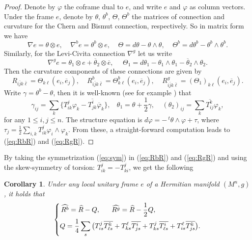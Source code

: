 \documentclass{amsart}
\newtheorem{corollary}[theorem]{Corollary}
\numberwithin{equation}{section}
\begin{document}
\begin{proof}
Denote by $\varphi$ the coframe dual to $e$, and write $e$ and $\varphi$ as column vectors. Under the frame $e$, denote by $\theta$, $\theta^b$, $\Theta$, $\Theta^b$ the matrices of connection and curvature for the Chern and Bismut connection, respectively. So in matrix form we have
$$\nabla e = \theta \otimes  e, \ \ \ \ \ \nabla^b e = \theta^b \otimes  e, \ \ \ \ \ \Theta = d\theta - \theta \wedge \theta,  \ \ \ \ \ \Theta^b = d\theta^b - \theta^b \wedge \theta^b. $$
Similarly, for the Levi-Civita connection $\nabla^g$ let us write
$$ \nabla^g e = \theta_1 \otimes e + \overline{\theta}_2 \otimes \overline{e}, \ \ \ \ \ \  \Theta_1 = d\theta_1 - \theta_1 \wedge \theta_1 - \overline{\theta}_2 \wedge \theta_2. $$
Then the curvature components of these connections are given by
$$ R_{i\bar{j}k\bar{\ell}}= \Theta_{k\ell} (e_i, \overline{e}_j), \ \ \ \ \ R^b_{i\bar{j}k\bar{\ell}}= \Theta^b_{k\ell} (e_i, \overline{e}_j), \ \ \ \ \ R^g_{i\bar{j}k\bar{\ell}}= (\Theta_1)_{k\ell} (e_i, \overline{e}_j). $$
Write $\gamma=\theta^b-\theta $, then it is  well-known (see for example \cite{YangZ}) that
$$ \gamma_{ij} = \sum_k \big\{ T^j_{ik}\varphi_k - \overline{T^i_{jk} } \overline{\varphi}_k \big\}, \ \ \ \ \theta_1 =\theta + \frac12 \gamma, \ \ \ \ \ (\theta_2)_{ij} = \sum_k \overline{T^k_{ij}} \varphi_k, $$
for any $1\leq i,j\leq n$. The structure equation is $d\varphi = - \,^t\!\theta \wedge \varphi + \tau$, where $\tau_j = \frac12 \sum_{i,k}T^j_{ik}\varphi_i\wedge \varphi_k$. From these, a straight-forward computation leads to (\ref{eq:RbR}) and (\ref{eq:RgR}).
\end{proof}

By taking the symmetrization (\ref{eq:sym}) in (\ref{eq:RbR}) and (\ref{eq:RgR}) and using the skew-symmetry of torsion: $T^j_{ik}=-T^j_{ki}$, we get the following
\begin{corollary} \label{cor3}
Under any local unitary frame $e$ of a Hermitian manifold $(M^n,g)$, it holds that
\begin{equation}  \label{eq:Q}
\left\{ \begin{split} \widehat{R^b} = \widehat{R} -Q,    \ \ \ \ \ \widehat{R^g} = \widehat{R} -\frac12 Q, \hspace{2.3cm}\\
  Q = \frac14 \sum_s \big( T^{j}_{is} \overline{ T^k_{\ell s }} + T^{\ell }_{ks} \overline{ T^i_{j s }} + T^{j}_{ks} \overline{ T^i_{\ell s }} + T^{\ell}_{is} \overline{ T^k_{j s }} \big).
  \end{split} \right.
\end{equation}
\end{corollary}
\end{document}
